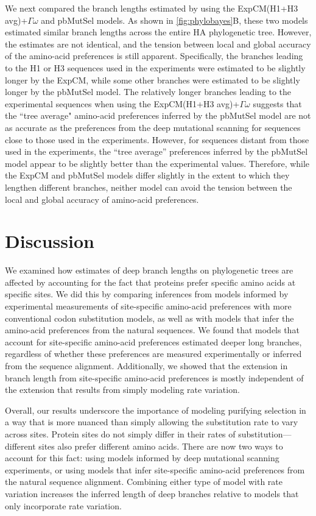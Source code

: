\documentclass[11pt]{article}
\begin{document}
We next compared the branch lengths estimated by using the ExpCM(H1+H3 avg)+$\Gamma\omega$ and pbMutSel models.
As shown in \ref{fig:phylobayes}B, these two models estimated similar branch lengths across the entire HA phylogenetic tree. 
However, the estimates are not identical, and the tension between local and global accuracy of the amino-acid preferences is still apparent. 
Specifically, the branches leading to the H1 or H3 sequences used in the experiments were estimated to be slightly longer by the ExpCM, while some other branches were estimated to be slightly longer by the pbMutSel model. 
The relatively longer branches leading to the experimental sequences when using the ExpCM(H1+H3 avg)+$\Gamma\omega$ suggests that the ``tree average" amino-acid preferences inferred by the pbMutSel model are not as accurate as the preferences from the deep mutational scanning for sequences close to those used in the experiments. 
However, for sequences distant from those used in the experiments, the ``tree average'' preferences inferred by the pbMutSel model appear to be slightly better than the experimental values.
Therefore, while the ExpCM and pbMutSel models differ slightly in the extent to which they lengthen different branches, neither model can avoid the tension between the local and global accuracy of amino-acid preferences. 

\section*{Discussion}
 
We examined how estimates of deep branch lengths on phylogenetic trees are affected by accounting for the fact that proteins prefer specific amino acids at specific sites. 
We did this by comparing inferences from models informed by experimental measurements of site-specific amino-acid preferences with more conventional codon substitution models, as well as with models that infer the amino-acid preferences from the natural sequences.
We found that models that account for site-specific amino-acid preferences estimated deeper long branches, regardless of whether these preferences are measured experimentally or inferred from the sequence alignment.
Additionally, we showed that the extension in branch length from site-specific amino-acid preferences is mostly independent of the extension that results from simply modeling rate variation. 

Overall, our results underscore the importance of modeling purifying selection in a way that is more nuanced than simply allowing the substitution rate to vary across sites.
Protein sites do not simply differ in their rates of substitution---different sites also prefer different amino acids.
There are now two ways to account for this fact: using models informed by deep mutational scanning experiments, or using models that infer site-specific amino-acid preferences from the natural sequence alignment.
Combining either type of model with rate variation increases the inferred length of deep branches relative to models that only incorporate rate variation.
\end{document}
